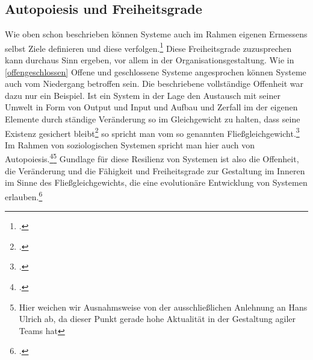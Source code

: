 \documentclass[a4paper,12pt]{article}
\begin{document}
\subsection{Autopoiesis und Freiheitsgrade}\label{selbsterhalt}
Wie oben schon beschrieben können Systeme auch im Rahmen eigenen Ermessens selbst Ziele definieren und diese verfolgen.\footcite[S. 114]{Ulrich1968} Diese Freiheitsgrade zuzusprechen kann durchaus Sinn ergeben, vor allem in der Organisationsgestaltung. Wie in \ref{offengeschlossen} Offene und geschlossene Systeme angesprochen können Systeme auch vom Niedergang betroffen sein. Die beschriebene vollständige Offenheit war dazu nur ein Beispiel. Ist ein System in der Lage den Austausch mit seiner Umwelt in Form von Output und Input und Aufbau und Zerfall im der eigenen Elemente durch ständige Veränderung so im Gleichgewicht zu halten, dass seine Existenz gesichert bleibt\footcite[S. 113]{Ulrich1968} so spricht man vom so genannten Fließgleichgewicht.\footcite[86]{Diesner2015} Im Rahmen von soziologischen Systemen spricht man hier auch von Autopoiesis.\footcite[S. 63]{Willke2006}\footnote{Hier weichen wir Ausnahmsweise von der ausschließlichen Anlehnung an Hans Ulrich ab, da dieser Punkt gerade hohe Aktualität in der Gestaltung agiler Teams hat} Gundlage für diese Resilienz von Systemen ist also die Offenheit, die Veränderung und die Fähigkeit und Freiheitsgrade zur Gestaltung im Inneren im Sinne des Fließgleichgewichts, die eine evolutionäre Entwicklung von Systemen erlauben.\footcite[144]{Malik2009}
 
\end{document}
